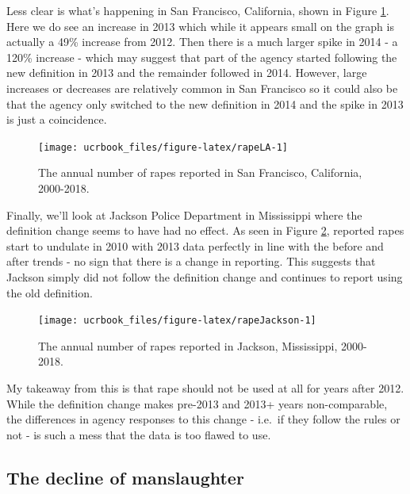\documentclass[
  12pt,
  openany]{book}
\begin{document}
Less clear is what's happening in San Francisco, California, shown in Figure \ref{fig:rapeLA}.
Here we do see an increase in 2013 which while it appears small on the graph is actually a 49\% increase from 2012. Then there is a much larger spike in 2014 - a 120\% increase - which may suggest that part of the agency started following the new definition in 2013 and the remainder followed in 2014. However, large increases or decreases are relatively common in San Francisco so it could also be that the agency only switched to the new definition in 2014 and the spike in 2013 is just a coincidence.

\begin{figure}

{\centering \texttt{[image: ucrbook\_files/figure-latex/rapeLA-1]} 

}

\caption{The annual number of rapes reported in San Francisco, California, 2000-2018.}\label{fig:rapeLA}
\end{figure}

Finally, we'll look at Jackson Police Department in Mississippi where the definition change seems to have had no effect. As seen in Figure \ref{fig:rapeJackson}, reported rapes start to undulate in 2010 with 2013 data perfectly in line with the before and after trends - no sign that there is a change in reporting. This suggests that Jackson simply did not follow the definition change and continues to report using the old definition.

\begin{figure}

{\centering \texttt{[image: ucrbook\_files/figure-latex/rapeJackson-1]} 

}

\caption{The annual number of rapes reported in Jackson, Mississippi, 2000-2018.}\label{fig:rapeJackson}
\end{figure}

My takeaway from this is that rape should not be used at all for years after 2012. While the definition change makes pre-2013 and 2013+ years non-comparable, the differences in agency responses to this change - i.e.~if they follow the rules or not - is such a mess that the data is too flawed to use.

\hypertarget{the-decline-of-manslaughter}{%
\subsection{The decline of manslaughter}\label{the-decline-of-manslaughter}}
\end{document}
